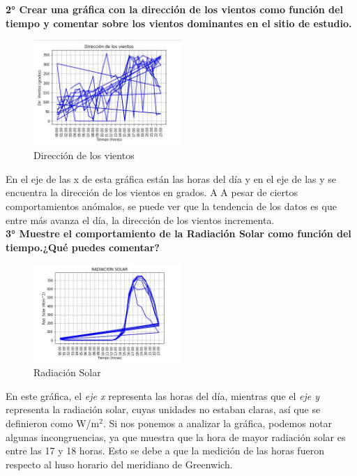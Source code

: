 \documentclass[a4paper]{article}
\begin{document}
\textbf{2° Crear una gráfica con la dirección de los vientos como función del tiempo y comentar sobre los vientos dominantes en el sitio de estudio.}

\begin{figure}[ht!]
\centering
\includegraphics[width=0.5\textwidth]{Direcci_n_de_los_vientos.JPG}
\caption{\label{fig:Dirección de los vientos }Dirección de los vientos}
\end{figure}

En el eje de las x de esta gráfica están las horas del día y en el eje de las y se encuentra la dirección de los vientos en grados. A A pesar de ciertos comportamientos anómalos, se puede ver que la tendencia de los datos es que entre más avanza el día, la dirección de los vientos incrementa.\\

\newpage
\textbf{3° Muestre el comportamiento de la Radiación Solar como función del tiempo.¿Qué puedes comentar?} \\




\begin{figure}[ht!]
\centering
\includegraphics[width=0.5\textwidth]{Rad_Solar.JPG}
\caption{\label{fig:Radación Solar}Radiación Solar}
\end{figure}

En este gráfica, el \textit{eje x} representa las horas del día, mientras que el \textit{eje y} representa la radiación solar, cuyas unidades no estaban claras, así que se definieron como W/m$^2$. Si nos ponemos a analizar la gráfica, podemos notar algunas incongruencias, ya que muestra que la hora de mayor radiación solar es entre las 17 y 18 horas. Esto se debe a que la medición de las horas fueron respecto al huso horario del meridiano de Greenwich. 
\end{document}
